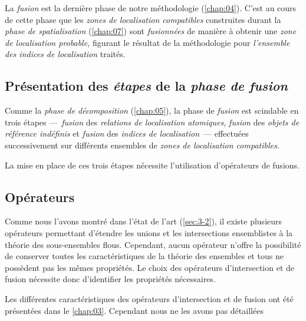 La \emph{fusion} est la dernière phase de notre méthodologie
(\autoref{chap:04}). C'est au cours de cette phase que les \emph{zones
  de localisation compatibles} construites durant la \emph{phase de
  spatialisation} (\autoref{chap:07}) sont \emph{fusionnées} de
manière à obtenir une \emph{zone de localisation probable,} figurant
le résultat de la méthodologie pour \emph{l'ensemble des indices de
  localisation} traités.

\subsection{Présentation des \emph{étapes} de la \emph{phase de
    fusion}}

Comme la \emph{phase de décomposition} (\autoref{chap:05}), la phase
de \emph{fusion} est scindable en trois étapes ---~\emph{fusion} des
\emph{relations de localisation atomiques,} \emph{fusion} des
\emph{objets de référence indéfinis} et \emph{fusion} des
\emph{indices de localisation}~--- effectuées successivement sur
différents ensembles de \emph{zones de localisation compatibles.}





La mise en place de ces trois étapes nécessite l'utilisation
d'opérateurs de fusions.


\subsection{Opérateurs}

Comme nous l'avons montré dans l'état de l'art (\autoref{sec:3-2}), il
existe plusieurs opérateurs permettant d'étendre les unions et les
intersections ensemblistes à la théorie des sous-ensembles
flous. Cependant, aucun opérateur n'offre la possibilité de conserver
toutes les caractéristiques de la théorie des ensembles et tous
ne possèdent pas les mêmes propriétés. Le choix des opérateurs
d'intersection et de fusion nécessite donc d'identifier les
propriétés nécessaires.


Les différentes caractéristiques des opérateurs d'intersection et de
fusion ont été présentées dans le \autoref{chap:03}. Cependant nous ne
les avons pas détaillées 



